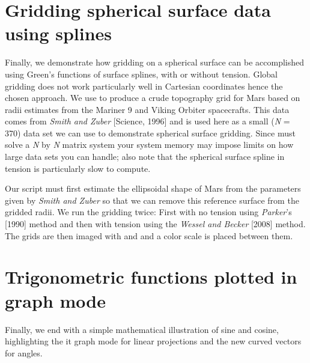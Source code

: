  

\section{Gridding spherical surface data using splines}

Finally, we demonstrate how gridding on a spherical surface can be accomplished using Green's functions
of surface splines, with or without tension.  Global gridding does not work particularly well in
Cartesian coordinates hence the chosen approach.  We use  to produce a crude
topography grid for Mars based on radii estimates from the Mariner 9 and Viking Orbiter spacecrafts.
This data comes from \emph{Smith and Zuber} [Science, 1996] and is used here as a small (\emph{N} = 370) data set we
can use to demonstrate spherical surface gridding.  Since  must solve a \emph{N} by \emph{N}
matrix system your system memory may impose limits on how large data sets you can handle; also note that
the spherical surface spline in tension is particularly slow to compute.


Our script must first estimate the ellipsoidal shape of Mars from the parameters given by \emph{Smith and Zuber}
so that we can remove this reference surface from the gridded radii.  We run the gridding twice: First with
no tension using \emph{Parker}'s [1990] method and then with tension using the \emph{Wessel and Becker} [2008] method.
The grids are then imaged with  and  and a color scale is placed between
them.

 

\section{Trigonometric functions plotted in graph mode}

Finally, we end with a simple mathematical illustration of sine and cosine, highlighting the
{it graph} mode for linear projections and the new curved vectors for angles.

